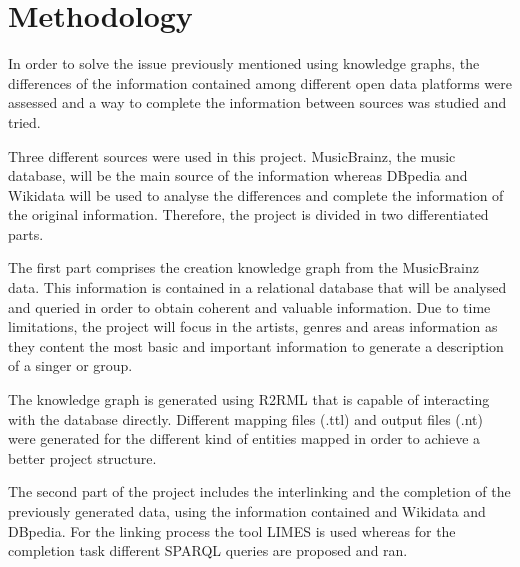 \section{Methodology}
In order to solve the issue previously mentioned using knowledge graphs, the differences of the information contained among different open data platforms were assessed and a way to complete the information between sources was studied and tried.  

Three different sources were used in this project. MusicBrainz, the music database, will be the main source of the information whereas DBpedia and Wikidata will be used to analyse the differences and complete the information of the original information.
Therefore, the project is divided in two differentiated parts.

The first part comprises the creation knowledge graph from the MusicBrainz data.
This information is contained in a relational database that will be analysed and queried in order to obtain coherent and valuable information.
Due to time limitations, the project will focus in the artists, genres and areas information as they content the most basic and important information to generate a description of a singer or group.  

The knowledge graph is generated using R2RML \citep{r2rml-tool} that is capable of interacting with the database directly.
Different mapping files (.ttl) and output files (.nt) were generated for the different kind of entities mapped in order to achieve a better project structure. 

The second part of the project includes the interlinking and the completion of the previously generated data, using the information contained and Wikidata and DBpedia.
For the linking process the tool LIMES is used whereas for the completion task different SPARQL queries are proposed and ran. 